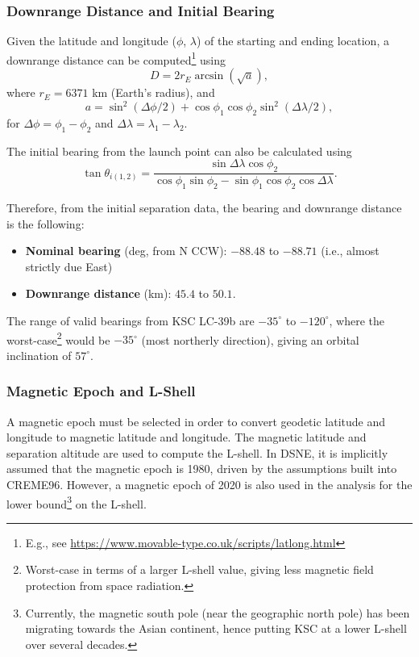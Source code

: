 \documentclass{hitec}
\begin{document}
\subsubsection{Downrange Distance and Initial Bearing}
Given the latitude and longitude ($\phi$, $\lambda$) of the starting and ending location, a downrange distance can be computed\footnote{E.g., see \url{https://www.movable-type.co.uk/scripts/latlong.html}} using
\begin{equation}
	D = 2r_E\arcsin(\sqrt{a}),
\end{equation}
where $r_E = 6371$ km (Earth's radius), and
\begin{equation}
	a = \sin^2(\Delta\phi/2) + \cos\phi_1\cos\phi_2\sin^2(\Delta\lambda/2),
\end{equation}
for $\Delta\phi = \phi_1-\phi_2$ and $\Delta\lambda = \lambda_1-\lambda_2$.

The initial bearing from the launch point can also be calculated using
\begin{equation}\label{eq:initial-bearing-shortdist}
	\tan\theta_{i(1,2)} = \frac{\sin\Delta\lambda\cos\phi_2}{\cos\phi_1\sin\phi_2-\sin\phi_1\cos\phi_2\cos\Delta\lambda}.
\end{equation}

Therefore, from the initial separation data, the bearing and downrange distance is the following:
\begin{itemize}
	\item \textbf{Nominal bearing} (deg, from N CCW): $-88.48$ to $-88.71$ (i.e., almost strictly due East)
	\item \textbf{Downrange distance} (km): $45.4$ to $50.1$.
\end{itemize}

The range of valid bearings from KSC LC-39b are $-35^\circ$ to $-120^\circ$, where the worst-case\footnote{Worst-case in terms of a larger L-shell value, giving less magnetic field protection from space radiation.} would be $-35^\circ$ (most northerly direction), giving an orbital inclination of $57^\circ$.

\subsubsection{Magnetic Epoch and L-Shell}\label{sssec:MagneticEpochAndL-Shell}
A magnetic epoch must be selected in order to convert geodetic latitude and longitude to magnetic latitude and longitude. The magnetic latitude and separation altitude are used to compute the L-shell. In DSNE, it is implicitly assumed that the magnetic epoch is 1980, driven by the assumptions built into CREME96. However, a magnetic epoch of 2020 is also used in the analysis for the lower bound\footnote{Currently, the magnetic south pole (near the geographic north pole) has been migrating towards the Asian continent, hence putting KSC at a lower L-shell over several decades.} on the L-shell.
\end{document}
